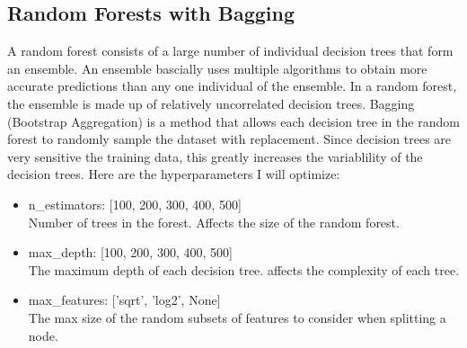 \documentclass[12pt]{article}
\begin{document}
\subsection{Random Forests with Bagging}
A random forest consists of a large number of individual decision trees that form an ensemble. An ensemble bascially uses multiple algorithms to obtain more accurate predictions than any one individual of the ensemble. In a random forest, the ensemble is made up of relatively uncorrelated decision trees. Bagging (Bootstrap Aggregation) is a method that allows each decision tree in the random forest to randomly sample the dataset with replacement. Since decision trees are very sensitive the training data, this greatly increases the variablility of the decision trees. Here are the hyperparameters I will optimize:
\begin{itemize}
    \item n\_estimators: [100, 200, 300, 400, 500]
    \\ Number of trees in the forest. Affects the size of the random forest.
    \item max\_depth: [100, 200, 300, 400, 500]
    \\ The maximum depth of each decision tree. affects the complexity of each tree.
    \item max\_features: ['sqrt', 'log2', None]
    \\ The max size of the random subsets of features to consider when splitting a node.
\end{itemize}
\end{document}
